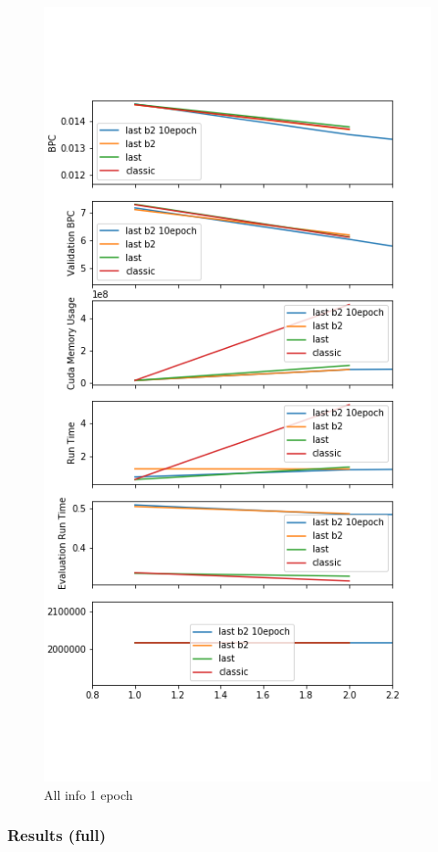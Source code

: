 \begin{figure}[h]
\centering
\includegraphics{parts/appendix/reports-gmsnn/docs_esteban-latex/test_reports/2018-06-12/history_frac_1e.png}
\caption{All info 1 epoch}
\end{figure}

\subsubsection{Results (full)}

